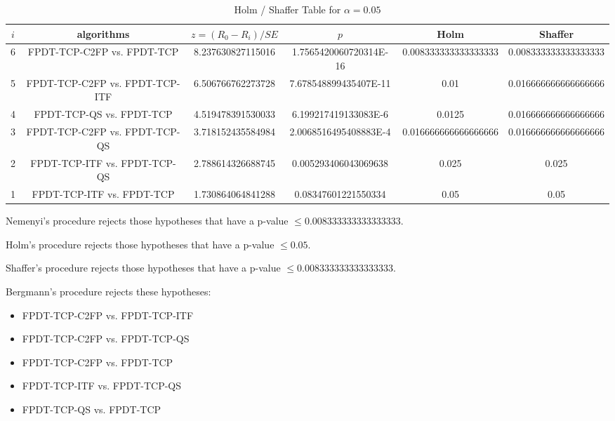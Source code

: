 \documentclass[a4paper,10pt]{article}
\begin{document}
\begin{landscape}
\begin{table}[!htp]
\centering\tiny
\caption{Holm / Shaffer Table for $\alpha=0.05$}
\begin{tabular}{cccccc}
$i$&algorithms&$z=(R_0 - R_i)/SE$&$p$&Holm&Shaffer\\
\hline
6&FPDT-TCP-C2FP vs. FPDT-TCP&8.237630827115016&1.7565420060720314E-16&0.008333333333333333&0.008333333333333333\\5&FPDT-TCP-C2FP vs. FPDT-TCP-ITF&6.506766762273728&7.678548899435407E-11&0.01&0.016666666666666666\\4&FPDT-TCP-QS vs. FPDT-TCP&4.519478391530033&6.199217419133083E-6&0.0125&0.016666666666666666\\3&FPDT-TCP-C2FP vs. FPDT-TCP-QS&3.718152435584984&2.0068516495408883E-4&0.016666666666666666&0.016666666666666666\\2&FPDT-TCP-ITF vs. FPDT-TCP-QS&2.788614326688745&0.005293406043069638&0.025&0.025\\1&FPDT-TCP-ITF vs. FPDT-TCP&1.730864064841288&0.08347601221550334&0.05&0.05\\\hline
\end{tabular}
\end{table}
Nemenyi's procedure rejects those hypotheses that have a p-value $\le0.008333333333333333$.


Holm's procedure rejects those hypotheses that have a p-value $\le0.05$.


Shaffer's procedure rejects those hypotheses that have a p-value $\le0.008333333333333333$.


Bergmann's procedure rejects these hypotheses:


\begin{itemize}


\item FPDT-TCP-C2FP vs. FPDT-TCP-ITF\item FPDT-TCP-C2FP vs. FPDT-TCP-QS\item FPDT-TCP-C2FP vs. FPDT-TCP\item FPDT-TCP-ITF vs. FPDT-TCP-QS\item FPDT-TCP-QS vs. FPDT-TCP\end{itemize}



\end{landscape}
\end{document}
